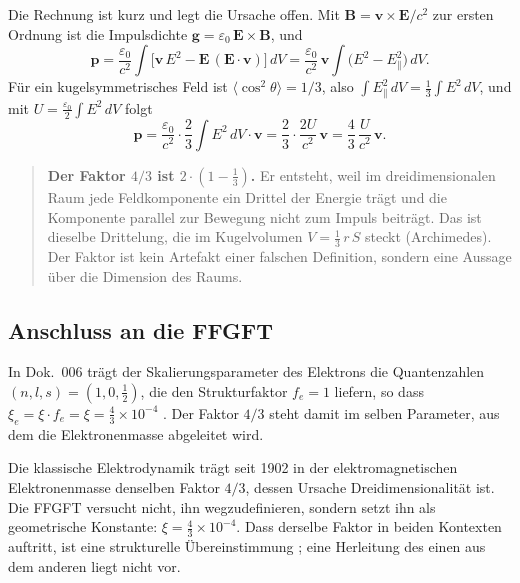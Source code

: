 Die Rechnung ist kurz und legt die Ursache offen. Mit $\mathbf B =
\mathbf v\times\mathbf E/c^2$ zur ersten Ordnung ist die Impulsdichte
$\mathbf g = \varepsilon_0\,\mathbf E\times\mathbf B$, und
\begin{equation}
  \mathbf p = \frac{\varepsilon_0}{c^2}\int
  \bigl[\mathbf v\,E^2 - \mathbf E\,(\mathbf E\cdot\mathbf v)\bigr]\,dV
  = \frac{\varepsilon_0}{c^2}\,\mathbf v \int \bigl(E^2 - E_\parallel^2\bigr)\,dV .
\end{equation}
Für ein kugelsymmetrisches Feld ist $\langle\cos^2\theta\rangle = 1/3$, also
$\int E_\parallel^2\,dV = \tfrac13\int E^2\,dV$, und mit
$U = \tfrac{\varepsilon_0}{2}\int E^2\,dV$ folgt
\begin{equation}
  \mathbf p = \frac{\varepsilon_0}{c^2}\cdot\frac{2}{3}\int E^2\,dV\cdot\mathbf v
  = \frac{2}{3}\cdot\frac{2U}{c^2}\,\mathbf v = \frac{4}{3}\,\frac{U}{c^2}\,\mathbf v .
\end{equation}

\begin{quote}
\textbf{Der Faktor $4/3$ ist $2\cdot(1-\tfrac13)$.} Er entsteht, weil im
dreidimensionalen Raum jede Feldkomponente ein Drittel der Energie trägt und
die Komponente parallel zur Bewegung nicht zum Impuls beiträgt. Das ist
dieselbe Drittelung, die im Kugelvolumen $V = \tfrac13\,r\,S$ steckt
(Archimedes). Der Faktor ist kein Artefakt einer falschen Definition, sondern
eine Aussage über die Dimension des Raums.
\end{quote}

\subsection{Anschluss an die FFGFT \SM}

In Dok.~006 trägt der Skalierungsparameter des Elektrons die Quantenzahlen
$(n,l,s) = (1,0,\tfrac12)$, die den Strukturfaktor $f_e = 1$ liefern, so dass
$\xi_e = \xi\cdot f_e = \xi = \tfrac{4}{3}\times10^{-4}$ \EM. Der Faktor $4/3$
steht damit im selben Parameter, aus dem die Elektronenmasse abgeleitet wird.

Die klassische Elektrodynamik trägt seit 1902 in der elektromagnetischen
Elektronenmasse denselben Faktor $4/3$, dessen Ursache Dreidimensionalität ist.
Die FFGFT versucht nicht, ihn wegzudefinieren, sondern setzt ihn als geometrische
Konstante: $\xi = \tfrac{4}{3}\times10^{-4}$. Dass derselbe Faktor in beiden
Kontexten auftritt, ist eine strukturelle Übereinstimmung \SM; eine Herleitung
des einen aus dem anderen liegt nicht vor.

